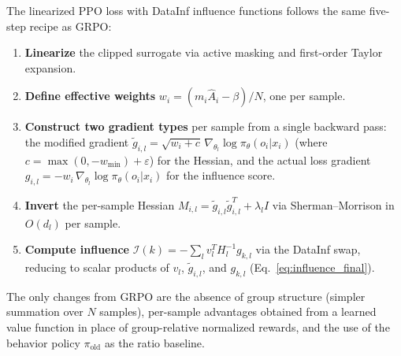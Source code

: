 \documentclass{article}
\begin{document}
The linearized PPO loss with DataInf influence functions follows the same five-step recipe as GRPO:
\begin{enumerate}
    \item \textbf{Linearize} the clipped surrogate via active masking and first-order Taylor expansion.
    \item \textbf{Define effective weights} $w_i = (m_i\hat{A}_i - \beta)/N$, one per sample.
    \item \textbf{Construct two gradient types} per sample from a single backward pass: the modified gradient $\tilde{g}_{i,l} = \sqrt{w_i+c}\,\nabla_{\theta_l}\log\pi_\theta(o_i|x_i)$ (where $c = \max(0,-w_{\min})+\varepsilon$) for the Hessian, and the actual loss gradient $g_{i,l} = -w_i\,\nabla_{\theta_l}\log\pi_\theta(o_i|x_i)$ for the influence score.
    \item \textbf{Invert} the per-sample Hessian $M_{i,l} = \tilde{g}_{i,l}\tilde{g}_{i,l}^T + \lambda_l I$ via Sherman--Morrison in $O(d_l)$ per sample.
    \item \textbf{Compute influence} $\mathcal{I}(k) = -\sum_l v_l^T H_l^{-1} g_{k,l}$ via the DataInf swap, reducing to scalar products of $v_l$, $\tilde{g}_{i,l}$, and $g_{k,l}$ (Eq.~\eqref{eq:influence_final}).
\end{enumerate}
The only changes from GRPO are the absence of group structure (simpler summation over $N$ samples), per-sample advantages obtained from a learned value function in place of group-relative normalized rewards, and the use of the behavior policy $\pi_{\mathrm{old}}$ as the ratio baseline.
\end{document}
